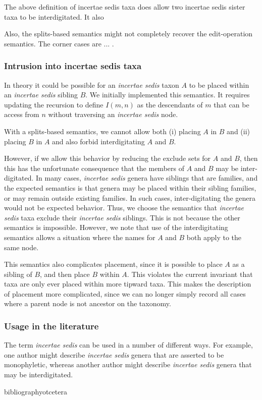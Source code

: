 \documentclass[english]{article}
\begin{document}
The above definition of incertae sedis taxa does allow two incertae
sedis sister taxa to be interdigitated. It also

Also, the splits-based semantics might not completely recover the
edit-operation semantics. The corner cases are ... .

\subsubsection{Intrusion into incertae sedis taxa}

In theory it could be possible for an \emph{incertae sedis} taxon $A$
to be placed within an \emph{incertae sedis} sibling $B$. We initially
implemented this semantics. It requires updating the recursion to
define $I(m,n)$ as the descendants of $m$ that can be access from $n$
without traversing an \emph{incertae sedis} node.

With a splits-based semantics, we cannot allow both (i) placing $A$ in
$B$ and (ii) placing $B$ in $A$ and also forbid interdigitating $A$
and $B$.

However, if we allow this behavior by reducing the exclude sets for
$A$ and $B$, then this has the unfortunate consequence that the
members of $A$ and $B$ may be inter-digitated. In many cases,
\emph{incertae sedis} genera have siblings that are families, and the
expected semantics is that genera may be placed within their sibling
families, or may remain outside existing families. In such cases,
inter-digitating the genera would not be expected behavior. Thus, we
choose the semantics that \emph{incertae sedis} taxa exclude their
\emph{incertae sedis} siblings. This is not because the other
semantics is impossible. However, we note that use of the
interdigitating semantics allows a situation where the names for $A$
and $B$ both apply to the same node.

This semantics also complicates placement, since it is possible to
place $A$ as a sibling of $B$, and then place $B$ within $A$. This
violates the current invariant that taxa are only ever placed within
more tipward taxa. This makes the description of placement more
complicated, since we can no longer simply record all cases where a
parent node is not ancestor on the taxonomy.

\subsubsection{Usage in the literature}

The term \emph{incertae sedis} can be used in a number of different
ways. For example,\emph{ }one author might describe \emph{incertae
sedis} genera that are asserted to be monophyletic, whereas another
author might describe \emph{incertae sedis} genera that may be
interdigitated.

 bibliography{otcetera}
\end{document}
